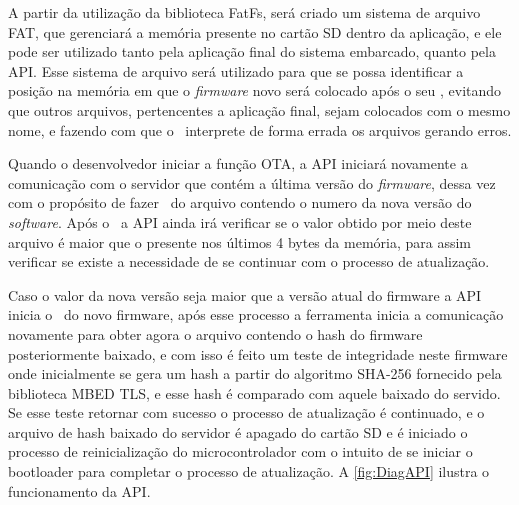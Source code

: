 A partir da utilização da biblioteca FatFs, será criado um sistema de arquivo FAT, que gerenciará a memória presente no cartão SD dentro da aplicação, e ele pode ser utilizado tanto pela aplicação final do sistema embarcado, quanto pela API. Esse sistema de arquivo será utilizado para que se possa identificar a posição na memória em que o \textit{firmware} novo será colocado após o seu \download, evitando que outros arquivos, pertencentes a aplicação final, sejam colocados com o mesmo nome, e fazendo com que o \bootloader\ interprete de forma errada os arquivos gerando erros.

Quando o desenvolvedor iniciar a função OTA, a API iniciará novamente a comunicação com o servidor que contém a última versão do \textit{firmware}, dessa vez com o propósito de fazer \download\ do arquivo contendo o numero da nova versão do \textit{software}. Após o \download\ a API ainda irá verificar se o valor obtido por meio deste arquivo é maior que o presente nos últimos 4 bytes da memória, para assim verificar se existe a necessidade de se continuar com o processo de atualização. 

Caso o valor da nova versão seja maior que a versão atual do firmware a API inicia o \download\ do novo firmware, após esse processo a ferramenta inicia a comunicação novamente para obter agora o arquivo contendo o hash do firmware posteriormente baixado, e com isso é feito um teste de integridade neste firmware onde inicialmente se gera um hash a partir do algoritmo SHA-256 fornecido pela biblioteca MBED TLS, e esse hash é comparado com aquele baixado do servido. Se esse teste retornar com sucesso o processo de atualização é continuado, e o arquivo de hash baixado do servidor é apagado do cartão SD e é iniciado o processo de reinicialização do microcontrolador com o intuito de se iniciar o bootloader para completar o processo de atualização.
A \autoref{fig:DiagAPI} ilustra o funcionamento da API.


